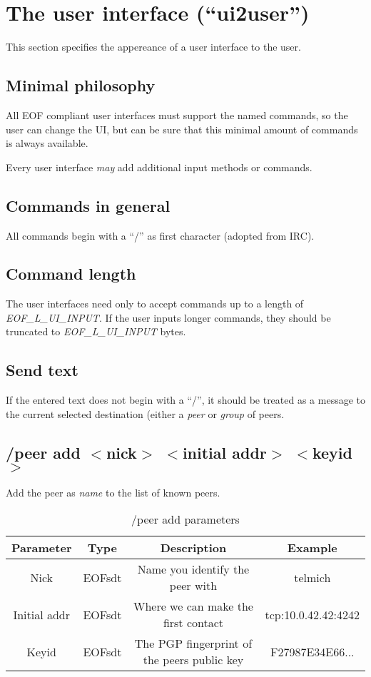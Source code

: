 \documentclass[12pt,a4paper]{book}
\begin{document}
\section{The user interface ("`ui2user"')}
This section specifies the appereance of a user interface to the user.
\subsection{Minimal philosophy}
All EOF compliant user interfaces must support the named commands, so the
user can change the UI, but can be sure that this minimal amount of
commands is always available.

Every user interface \emph{may} add additional input methods or commands.
\subsection{Commands in general}
All commands begin with a "`/"' as first character (adopted from IRC).
\subsection{Command length}
The user interfaces need only to accept commands up to a length of
\emph{EOF\_L\_UI\_INPUT}.
If the user inputs longer commands, they should be truncated
to \emph{EOF\_L\_UI\_INPUT} bytes.
\subsection{Send text}
If the entered text does not begin with a "`/"', it should be treated
as a message to the current selected destination (either
a \emph{peer} or \emph{group} of peers.
\subsection{/peer add $<$nick$>$ $<$initial addr$>$ $<$keyid$>$}
Add the peer as \textit{name} to the list of known peers.

%
\begin{longtable}{|c|c|c|c|}
\caption{/peer add parameters}\\
\hline
\textbf{Parameter} & \textbf{Type} & \textbf{Description} & \textbf{Example}\\
\hline
Nick & EOFsdt & Name you identify the peer with & telmich\\
\hline
Initial addr & EOFsdt & Where we can make the first contact & tcp:10.0.42.42:4242\\
\hline
Keyid & EOFsdt & The PGP fingerprint of the peers public key & F27987E34E66...\\
\hline
\end{longtable}
\end{document}
